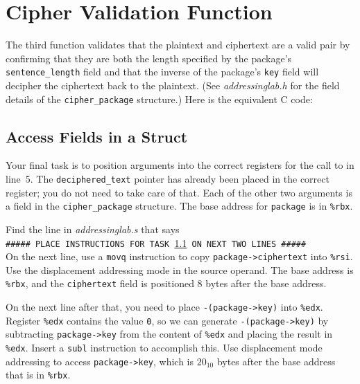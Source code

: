 \section{Cipher Validation Function}

The third function validates that the plaintext and ciphertext are a valid pair
by confirming that they are both the length specified by the package's
\lstinline{sentence_length} field and that the inverse of the package's
\lstinline{key} field will decipher the ciphertext back to the plaintext. (See
\textit{addressinglab.h} for the field details of the
\lstinline{cipher_package} structure.) Here is the equivalent C code:



\subsection{Access Fields in a Struct}\label{task8}

Your final task is to position arguments into the correct registers for the
call to  in line~5. The \lstinline{deciphered_text}
pointer has already been placed in the correct register; you do not need to
take care of that. Each of the other two arguments is a field in the
\lstinline{cipher_package} structure. The base address for \lstinline{package}
is in \lstinline{%rbx}.

Find the line in \textit{addressinglab.s} that says \\
\texttt{\#\#\#\#\# PLACE INSTRUCTIONS FOR TASK \ref{task8} ON NEXT TWO LINES \#\#\#\#\#} \\
On the next line, use a \lstinline{movq} instruction to copy
\lstinline{package->ciphertext} into \lstinline{%rsi}. Use the displacement
addressing mode in the source operand. The base address is \lstinline{%rbx},
and the \lstinline{ciphertext} field is positioned 8 bytes after the base
address.

On the next line after that, you need to place \lstinline{-(package->key)} into
\lstinline{%edx}. Register \lstinline{%edx} contains the value \lstinline{0},
so we can generate \lstinline{-(package->key)} by subtracting
\lstinline{package->key} from the content of \lstinline{%edx} and placing the
result in \lstinline{%edx}. Insert a \lstinline{subl} instruction to accomplish
this. Use displacement mode addressing to access \lstinline{package->key}, which
is $20_{10}$ bytes after the base address that is in \lstinline{%rbx}.

